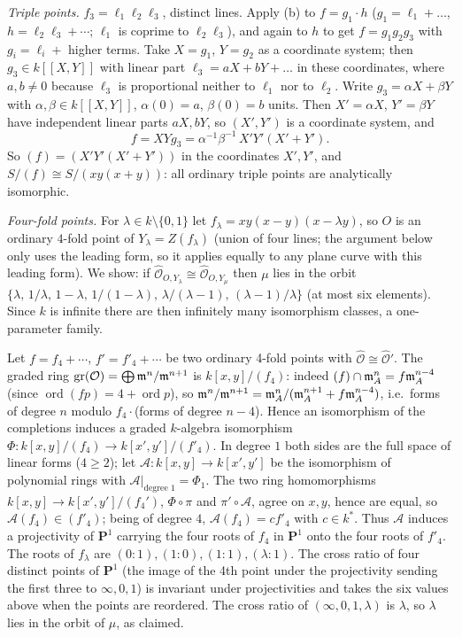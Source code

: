 \documentclass[11pt]{article}
\begin{document}
\emph{Triple points.} $f_3=\ell_1\ell_2\ell_3$, distinct lines. Apply (b) to $f=g_1\cdot h$ ($g_1=\ell_1+\dots$, $h=\ell_2\ell_3+\cdots$; $\ell_1$ is coprime to $\ell_2\ell_3$), and again to $h$ to get $f=g_1g_2g_3$ with $g_i=\ell_i+$ higher terms. Take $X=g_1$, $Y=g_2$ as a coordinate system; then $g_3\in k[[X,Y]]$ with linear part $\ell_3=aX+bY+\ldots$ in these coordinates, where $a,b\neq 0$ because $\ell_3$ is proportional neither to $\ell_1$ nor to $\ell_2$. Write $g_3=\alpha X+\beta Y$ with $\alpha,\beta\in k[[X,Y]]$, $\alpha(0)=a$, $\beta(0)=b$ units. Then $X'=\alpha X$, $Y'=\beta Y$ have independent linear parts $aX,bY$, so $(X',Y')$ is a coordinate system, and
\[
f=XYg_3=\alpha^{-1}\beta^{-1}\,X'Y'(X'+Y').
\]
So $(f)=(X'Y'(X'+Y'))$ in the coordinates $X',Y'$, and $S/(f)\cong S/(xy(x+y))$: all ordinary triple points are analytically isomorphic.

\emph{Four-fold points.} For $\lambda\in k\setminus\{0,1\}$ let $f_\lambda=xy(x-y)(x-\lambda y)$, so $O$ is an ordinary $4$-fold point of $Y_\lambda=Z(f_\lambda)$ (union of four lines; the argument below only uses the leading form, so it applies equally to any plane curve with this leading form). We show: if $\hat{\mathcal O}_{O,Y_\lambda}\cong\hat{\mathcal O}_{O,Y_\mu}$ then $\mu$ lies in the orbit $\{\lambda,\,1/\lambda,\,1-\lambda,\,1/(1-\lambda),\,\lambda/(\lambda-1),\,(\lambda-1)/\lambda\}$ (at most six elements). Since $k$ is infinite there are then infinitely many isomorphism classes, a one-parameter family.

Let $f=f_4+\cdots$, $f'=f'_4+\cdots$ be two ordinary 4-fold points with $\hat{\mathcal O}\cong\hat{\mathcal O}'$. The graded ring $\operatorname{gr}(\mathcal O)=\bigoplus\mathfrak m^n/\mathfrak m^{n+1}$ is $k[x,y]/(f_4)$: indeed $(f)\cap\mathfrak m_A^n=f\mathfrak m_A^{n-4}$ (since $\operatorname{ord}(fp)=4+\operatorname{ord}p$), so $\mathfrak m^n/\mathfrak m^{n+1}=\mathfrak m_A^n/(\mathfrak m_A^{n+1}+f\mathfrak m_A^{n-4})$, i.e.\ forms of degree $n$ modulo $f_4\cdot$(forms of degree $n-4$). Hence an isomorphism of the completions induces a graded $k$-algebra isomorphism $\Phi:k[x,y]/(f_4)\to k[x',y']/(f'_4)$. In degree $1$ both sides are the full space of linear forms ($4\ge2$); let $\mathcal A:k[x,y]\to k[x',y']$ be the isomorphism of polynomial rings with $\mathcal A|_{\text{degree }1}=\Phi_1$. The two ring homomorphisms $k[x,y]\to k[x',y']/(f_4')$, $\Phi\circ\pi$ and $\pi'\circ\mathcal A$, agree on $x,y$, hence are equal, so $\mathcal A(f_4)\in(f'_4)$; being of degree $4$, $\mathcal A(f_4)=cf'_4$ with $c\in k^*$. Thus $\mathcal A$ induces a projectivity of $\mathbf P^1$ carrying the four roots of $f_4$ in $\mathbf P^1$ onto the four roots of $f'_4$. The roots of $f_\lambda$ are $(0:1),(1:0),(1:1),(\lambda:1)$. The cross ratio of four distinct points of $\mathbf P^1$ (the image of the 4th point under the projectivity sending the first three to $\infty,0,1$) is invariant under projectivities and takes the six values above when the points are reordered. The cross ratio of $(\infty,0,1,\lambda)$ is $\lambda$, so $\lambda$ lies in the orbit of $\mu$, as claimed.
\end{document}
